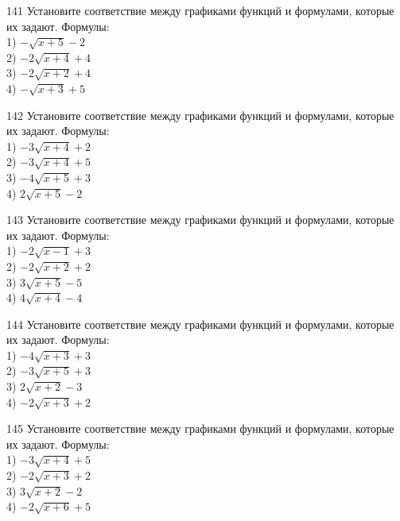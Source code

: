\documentclass[4apaper]{article}
\begin{document}
\begin{taskBN}{141}
Установите соответствие между графиками функций и формулами, которые их задают. Формулы: \\1) $-\sqrt{x+5}-2$\\2) $-2\sqrt{x+4}+4$\\3) $-2\sqrt{x+2}+4$\\4) $-\sqrt{x+3}+5$
\end{taskBN}

\begin{taskBN}{142}
Установите соответствие между графиками функций и формулами, которые их задают. Формулы: \\1) $-3\sqrt{x+4}+2$\\2) $-3\sqrt{x+4}+5$\\3) $-4\sqrt{x+5}+3$\\4) $2\sqrt{x+5}-2$
\end{taskBN}

\begin{taskBN}{143}
Установите соответствие между графиками функций и формулами, которые их задают. Формулы: \\1) $-2\sqrt{x-1}+3$\\2) $-2\sqrt{x+2}+2$\\3) $3\sqrt{x+5}-5$\\4) $4\sqrt{x+4}-4$
\end{taskBN}

\begin{taskBN}{144}
Установите соответствие между графиками функций и формулами, которые их задают. Формулы: \\1) $-4\sqrt{x+3}+3$\\2) $-3\sqrt{x+5}+3$\\3) $2\sqrt{x+2}-3$\\4) $-2\sqrt{x+3}+2$
\end{taskBN}

\begin{taskBN}{145}
Установите соответствие между графиками функций и формулами, которые их задают. Формулы: \\1) $-3\sqrt{x+4}+5$\\2) $-2\sqrt{x+3}+2$\\3) $3\sqrt{x+2}-2$\\4) $-2\sqrt{x+6}+5$
\end{taskBN}
\end{document}
